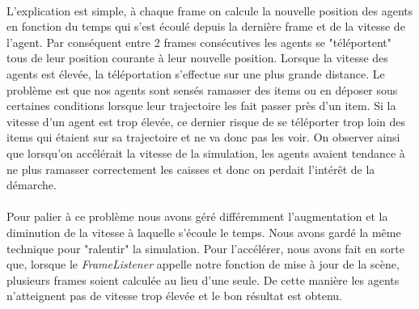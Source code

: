 \paragraph{}
L'explication est simple, à chaque frame on calcule la nouvelle position des
agents en fonction du temps qui s'est écoulé depuis la dernière frame et de la
vitesse de l'agent. Par conséquent entre 2 frames consécutives les agents se
"téléportent" tous de leur position courante à leur nouvelle position. Lorsque
la vitesse des agents est élevée, la téléportation s'effectue sur une plus
grande distance. Le problème est que nos agents sont sensés ramasser des items
ou en déposer sous certaines conditions lorsque leur trajectoire les fait
passer près d'un item. Si la vitesse d'un agent est trop élevée, ce dernier
risque de se téléporter trop loin des items qui étaient sur sa trajectoire et
ne va donc pas les voir. On observer ainsi que lorsqu'on accélérait la vitesse
de la simulation, les agents avaient tendance à ne plus ramasser correctement
les caisses et donc on perdait l'intérêt de la démarche.

\paragraph{}
Pour palier à ce problème nous avons géré différemment l'augmentation et la
diminution de la vitesse à laquelle s'écoule le temps. Nous avons gardé la
même technique pour "ralentir" la simulation. Pour l'accélérer, nous avons
fait en sorte que, lorsque le \emph{FrameListener} appelle notre fonction de
mise à jour de la scène, plusieurs frames soient calculée au lieu d'une seule.
De cette manière les agents n'atteignent pas de vitesse trop élevée et le bon
résultat est obtenu.

